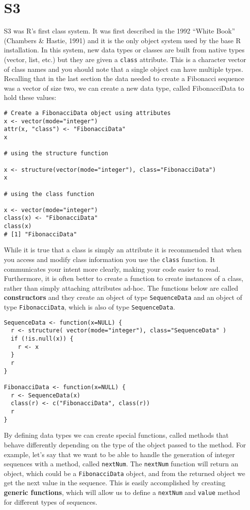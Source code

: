 \section{S3}\label{s3-ss}

S3 was R's first class system. It was first described in the 1992
``White Book'' (Chambers \& Hastie, 1991) and it is the only object
system used by the base R installation. In this system, new data types
or classes are built from native types (vector, list, etc.) but they are
given a \texttt{class} attribute. This is a character vector of class
names and you should note that a single object can have multiple types.
Recalling that in the last section the data needed to create a Fibonacci
sequence was a vector of size two, we can create a new data type, called
FibonacciData to hold these values:

\begin{verbatim}
# Create a FibonacciData object using attributes
x <- vector(mode="integer")
attr(x, "class") <- "FibonacciData"
x

# using the structure function

x <- structure(vector(mode="integer"), class="FibonacciData")
x

# using the class function

x <- vector(mode="integer")
class(x) <- "FibonacciData"
class(x)
# [1] "FibonacciData"
\end{verbatim}

While it is true that a class is simply an attribute it is recommended
that when you access and modify class information you use the
\texttt{class} function. It communicates your intent more clearly,
making your code easier to read. Furthermore, it is often better to
create a function to create instances of a class, rather than simply
attaching attributes ad-hoc. The functions below are called
\textbf{constructors} and they create an object of type
\texttt{SequenceData} and an object of type \texttt{FibonacciData},
which is also of type \texttt{SequenceData}.

\begin{verbatim}
SequenceData <- function(x=NULL) {
  r <- structure( vector(mode="integer"), class="SequenceData" )
  if (!is.null(x)) {
    r <- x
  }
  r
}

FibonacciData <- function(x=NULL) {
  r <- SequenceData(x)
  class(r) <- c("FibonacciData", class(r))
  r
}
\end{verbatim}

By defining data types we can create special functions, called methods
that behave differently depending on the type of the object passed to
the method. For example, let's say that we want to be able to handle the
generation of integer sequences with a method, called \texttt{nextNum}.
The \texttt{nextNum} function will return an object, which could be a
\texttt{FibonacciData} object, and from the returned object we get the
next value in the sequence. This is easily accomplished by creating
\textbf{generic functions}, which will allow us to define a
\texttt{nextNum} and \texttt{value} method for different types of
sequences.

